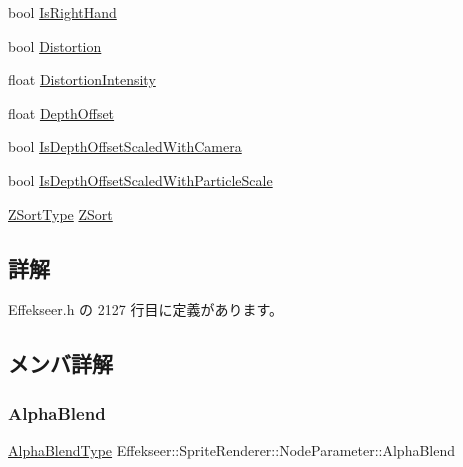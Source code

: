 \begin{DoxyCompactItemize}
\item 
bool \mbox{\hyperlink{struct_effekseer_1_1_sprite_renderer_1_1_node_parameter_a14d8e403ed9cc3ec7bb7f7e6a88595a1}{Is\+Right\+Hand}}
\item 
bool \mbox{\hyperlink{struct_effekseer_1_1_sprite_renderer_1_1_node_parameter_aae6a39601c61032914529de573cb5e32}{Distortion}}
\item 
float \mbox{\hyperlink{struct_effekseer_1_1_sprite_renderer_1_1_node_parameter_aab3176045ff052d13ab49a55edb9bb74}{Distortion\+Intensity}}
\item 
float \mbox{\hyperlink{struct_effekseer_1_1_sprite_renderer_1_1_node_parameter_a84a2261f63b8e81c72969ee5c0a5b2c8}{Depth\+Offset}}
\item 
bool \mbox{\hyperlink{struct_effekseer_1_1_sprite_renderer_1_1_node_parameter_a9df806e7ba3cb6d5da9399a03a7864af}{Is\+Depth\+Offset\+Scaled\+With\+Camera}}
\item 
bool \mbox{\hyperlink{struct_effekseer_1_1_sprite_renderer_1_1_node_parameter_a090334edbb3bc3fa04ff63f0443679f7}{Is\+Depth\+Offset\+Scaled\+With\+Particle\+Scale}}
\item 
\mbox{\hyperlink{namespace_effekseer_a7a8ec04f4de0308b5fdb7d66675bddaf}{Z\+Sort\+Type}} \mbox{\hyperlink{struct_effekseer_1_1_sprite_renderer_1_1_node_parameter_ac565028a6b9d045e4220676ef2e4e0d0}{Z\+Sort}}
\end{DoxyCompactItemize}


\subsection{詳解}


 Effekseer.\+h の 2127 行目に定義があります。



\subsection{メンバ詳解}
\mbox{\label{struct_effekseer_1_1_sprite_renderer_1_1_node_parameter_a1b14867e8d71ab1836d732866df2c973}} 
\subsubsection{\texorpdfstring{Alpha\+Blend}{AlphaBlend}}
{\footnotesize\ttfamily \mbox{\hyperlink{namespace_effekseer_a8c32fd5b7ec7feed73314b2ae8086949}{Alpha\+Blend\+Type}} Effekseer\+::\+Sprite\+Renderer\+::\+Node\+Parameter\+::\+Alpha\+Blend}



